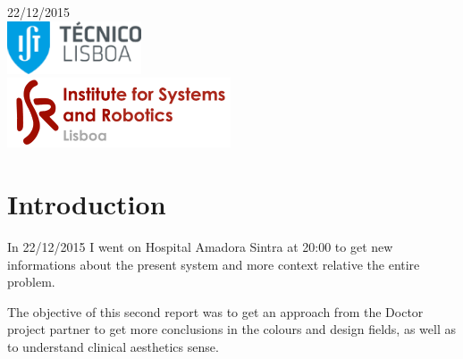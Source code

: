 \begin{titlepage}


{\large 22/12/2015}\\[2cm] %


\includegraphics{ist-logo.png}\\[0.5cm] %

\includegraphics{isr-logo.png}\\[0.5cm] %
 

\vfill %

\end{titlepage}

\section{Introduction}

In 22/12/2015 I went on Hospital Amadora Sintra at 20:00 to get new informations about the present system and more context relative the entire problem.

The objective of this second report was to get an approach from the Doctor project partner to get more conclusions in the colours and design fields, as well as to understand clinical aesthetics sense.

